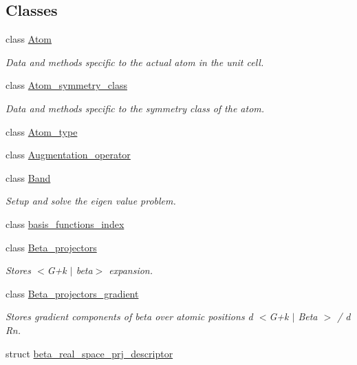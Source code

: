 \subsection*{Classes}
\begin{DoxyCompactItemize}
\item 
class \hyperlink{classsirius_1_1_atom}{Atom}
\begin{DoxyCompactList}\small\item\em Data and methods specific to the actual atom in the unit cell. \end{DoxyCompactList}\item 
class \hyperlink{classsirius_1_1_atom__symmetry__class}{Atom\+\_\+symmetry\+\_\+class}
\begin{DoxyCompactList}\small\item\em Data and methods specific to the symmetry class of the atom. \end{DoxyCompactList}\item 
class \hyperlink{classsirius_1_1_atom__type}{Atom\+\_\+type}
\item 
class \hyperlink{classsirius_1_1_augmentation__operator}{Augmentation\+\_\+operator}
\item 
class \hyperlink{classsirius_1_1_band}{Band}
\begin{DoxyCompactList}\small\item\em Setup and solve the eigen value problem. \end{DoxyCompactList}\item 
class \hyperlink{classsirius_1_1basis__functions__index}{basis\+\_\+functions\+\_\+index}
\item 
class \hyperlink{classsirius_1_1_beta__projectors}{Beta\+\_\+projectors}
\begin{DoxyCompactList}\small\item\em Stores $<$G+k $\vert$ beta$>$ expansion. \end{DoxyCompactList}\item 
class \hyperlink{classsirius_1_1_beta__projectors__gradient}{Beta\+\_\+projectors\+\_\+gradient}
\begin{DoxyCompactList}\small\item\em Stores gradient components of beta over atomic positions d $<$G+k $\vert$ Beta $>$ / d Rn. \end{DoxyCompactList}\item 
struct \hyperlink{structsirius_1_1beta__real__space__prj__descriptor}{beta\+\_\+real\+\_\+space\+\_\+prj\+\_\+descriptor}
\item 

\end{DoxyCompactItemize}
